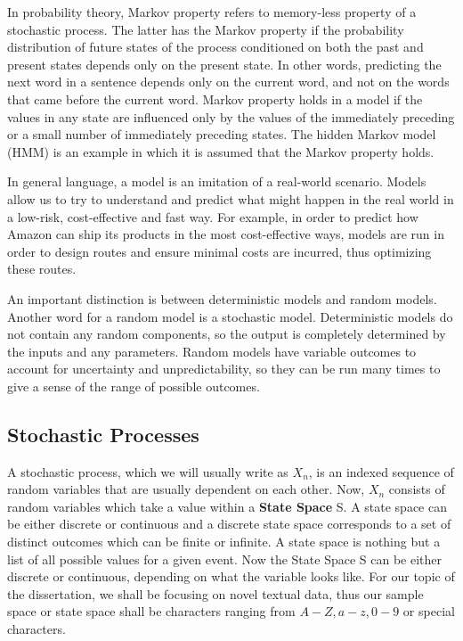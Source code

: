 In probability theory, Markov property refers to memory-less property of a stochastic process. The latter has the Markov property if the probability distribution of future states of the process conditioned on both the past and present states depends only on the present state. In other words, predicting the next word in a sentence depends only on the current word, and not on the words that came before the current word. Markov property holds in a model if the values in any state are influenced only by the values of the immediately preceding or a small number of immediately preceding states. The hidden Markov model (HMM) is an example in which it is assumed that the Markov property holds.

In general language, a model is an imitation of a real-world scenario.  Models allow us to try to understand and predict what might happen in the real world in a low-risk, cost-effective and fast way. For example, in order to predict how Amazon can ship its products in the most cost-effective ways, models are run in order to design routes and ensure minimal costs are incurred, thus optimizing these routes. 

An important distinction is between deterministic models and random models. Another word for a random model is a stochastic model. Deterministic models do not contain any random components, so the output is completely determined by the inputs and any parameters. Random models have variable outcomes to account for uncertainty and unpredictability, so they can be run many times to give a sense of the range of possible outcomes. 

\subsection{Stochastic Processes} %
\label{sec:stochastic-processes} %

A stochastic process, which we will usually write as  $X_{n}$, is an indexed sequence of random variables that are usually dependent on each other. Now, $X_{n}$ consists of random variables which take a value within a \textbf{State Space} S. A state space can be either discrete or continuous and a discrete state space corresponds to a set of distinct outcomes which can be finite or infinite. A state space is nothing but a list of all possible values for a given event. Now the State Space S can be either discrete or continuous, depending on what the variable looks like. For our topic of the dissertation, we shall be focusing on novel textual data, thus our sample space or state space shall be characters ranging from $A-Z, a-z, 0-9$ or special characters. 

